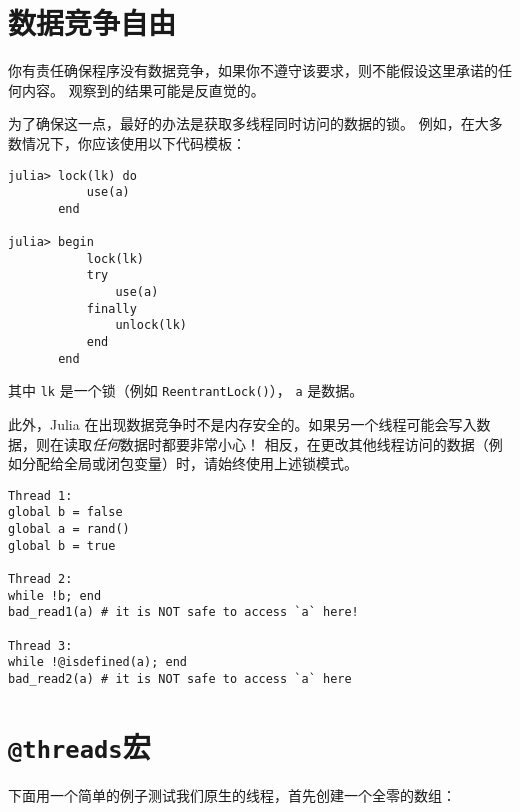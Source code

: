 \hypertarget{3389279084104754524}{}


\section{数据竞争自由}



你有责任确保程序没有数据竞争，如果你不遵守该要求，则不能假设这里承诺的任何内容。 观察到的结果可能是反直觉的。



为了确保这一点，最好的办法是获取多线程同时访问的数据的锁。 例如，在大多数情况下，你应该使用以下代码模板：




\begin{verbatim}
julia> lock(lk) do
           use(a)
       end

julia> begin
           lock(lk)
           try
               use(a)
           finally
               unlock(lk)
           end
       end
\end{verbatim}



其中 \texttt{lk} 是一个锁（例如 \texttt{ReentrantLock()}）， \texttt{a} 是数据。



此外，Julia 在出现数据竞争时不是内存安全的。如果另一个线程可能会写入数据，则在读取\emph{任何}数据时都要非常小心！ 相反，在更改其他线程访问的数据（例如分配给全局或闭包变量）时，请始终使用上述锁模式。




\begin{verbatim}
Thread 1:
global b = false
global a = rand()
global b = true

Thread 2:
while !b; end
bad_read1(a) # it is NOT safe to access `a` here!

Thread 3:
while !@isdefined(a); end
bad_read2(a) # it is NOT safe to access `a` here
\end{verbatim}



\hypertarget{5846243171627332000}{}


\section{\texttt{@threads}宏}



下面用一个简单的例子测试我们原生的线程，首先创建一个全零的数组：




